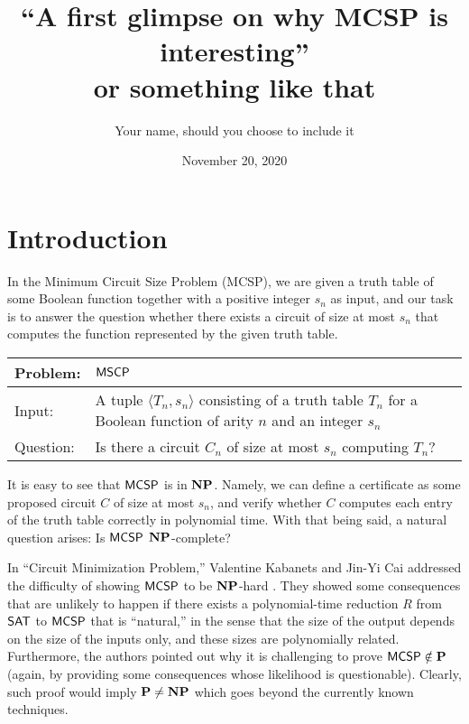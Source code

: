 \documentclass[11pt]{article}
\author{Your name, should you choose to include it}
\title{``A first glimpse on why MCSP is interesting''\\ or something like that}
\date{November 20, 2020}
\begin{document}
	\maketitle
	
\section{Introduction}

In the Minimum Circuit Size Problem (MCSP), we are given a truth table of some Boolean function together with a positive integer $s_n$ as input, and our task is to answer the question whether there exists a circuit of size at most $s_n$ that computes the function represented by the given truth table.

{
	\renewcommand{\arraystretch}{1.5}
	\begin{center}
		\begin{tabular}{|p{2cm}p{11cm}|}
			\hline
			Problem:
			&
			$\mathsf{MSCP}$
			\\
			\hline
			Input:
			&
			A tuple $\langle T_n, s_n \rangle$ consisting of a truth table $T_n$ for
			a Boolean function of arity $n$ and an integer $s_n$
			\\
			Question: & Is there a circuit $C_n$ of size at most $s_n$ computing $T_n$?
			\\
			\hline
		\end{tabular}
	\end{center}
}

It is easy to see that $\mathsf{MCSP}$ is in $\mathbf{NP}$. Namely, we can define a certificate as some proposed circuit $C$ of size at most $s_n$, and verify whether $C$ computes each entry of the truth table correctly in polynomial time. With that being said, a natural question arises: Is $\mathsf{MCSP}$  $\mathbf{NP}$-complete?

In ``Circuit Minimization Problem,'' Valentine Kabanets and Jin-Yi Cai addressed the difficulty of showing $\mathsf{MCSP}$ to be $\mathbf{NP}$-hard \cite{10.1145/335305.335314}. They showed some consequences that are unlikely to happen if there exists a polynomial-time reduction $R$ from $\mathsf{SAT}$ to $\mathsf{MCSP}$ that is ``natural,'' in the sense that the size of the output depends on the size of the inputs only, and these sizes are polynomially related.  Furthermore, the authors pointed out why it is challenging to prove $\mathsf{MCSP} \notin \mathbf{P}$ (again, by providing some consequences whose likelihood is questionable). Clearly, such proof would imply $\mathbf{P} \neq \mathbf{NP}$ which goes beyond the currently known techniques. 
\end{document}
